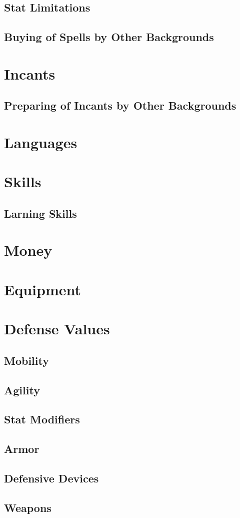 \begin{multicols}{2}
\subsection{Stat Limitations}
\subsection{Buying of Spells by Other Backgrounds}
\section{Incants}
\subsection{Preparing of Incants by Other Backgrounds}
\section{Languages}
\section{Skills}
\label{create-skills}
\subsection{Larning Skills}
\section{Money}
\section{Equipment}
\section{Defense Values}
\subsection{Mobility}
\subsection{Agility}
\subsection{Stat Modifiers}
\subsection{Armor}
\subsection{Defensive Devices}
\subsection{Weapons}
\end{multicols}